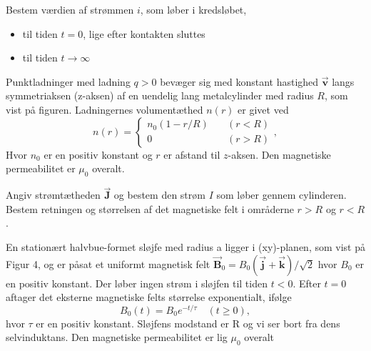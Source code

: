 \begin{figure}[ht]
    \centering
    \label{fig:opgave2}
\end{figure}
\begin{subexercise}[a]
Bestem værdien af strømmen $i$, som løber i kredsløbet,
 \begin{itemize}
	\item til tiden $t = 0$, lige efter kontakten sluttes
	\item til tiden $t\to \infty$
\end{itemize}
\end{subexercise}
\begin{solution}

\end{solution}
\begin{exercise}[Opgave 3]
Punktladninger med ladning $q>0$ bevæger sig med konstant hastighed $\vec{\mathbf{v}} $
langs symmetriaksen (z-aksen) af en uendelig lang metalcylinder med radius $R$, som vist på figuren. Ladningernes volumentæthed $n\left( r \right) $ er givet ved
\[
n\left( r \right) = 
\begin{cases}
	n_0\left( 1 - r /R \right) \quad & \left( r<R \right) \\
	0 \quad & \left( r > R \right) 
\end{cases}
,\] 
Hvor $n_0$ er en positiv konstant og $r$ er afstand til $z$-aksen. Den magnetiske permeabilitet er $\mu_0$ overalt.
\end{exercise}
\begin{figure}[ht]
    \centering
    \label{fig:opgave3}
\end{figure}
\begin{subexercise}[a]
Angiv strømtætheden $\vec{\mathbf{J}} $ og bestem den strøm $I$ som løber gennem cylinderen.\\
Bestem retningen og størrelsen af det magnetiske felt i områderne $r>R$ og  $r<R$.
\end{subexercise}
\begin{solution}
\end{solution}
\begin{exercise}[Opgave 4]
En stationært halvbue-formet sløjfe med radius a ligger i (xy)-planen, som vist på Figur 4, og er påsat et uniformt magnetisk felt $\vec{\mathbf{B}}_0=B_0\left(\vec{\mathbf{j}} + \vec{\mathbf{k}}  \right)/\sqrt{2} $
hvor $B_0$ er en positiv konstant. Der løber ingen strøm i sløjfen til tiden $t<0$.
Efter $t=0$ aftager det eksterne magnetiske felts størrelse exponentialt, ifølge
\[
B_0\left( t \right)  = B_0e^{-t /\tau} \quad \left( t\ge 0 \right) 
,\]
hvor $\tau$ er en positiv konstant. Sløjfens modstand er R og vi ser bort fra dens selvinduktans. Den magnetiske permeabilitet er lig $\mu_0$ overalt
\end{exercise}
